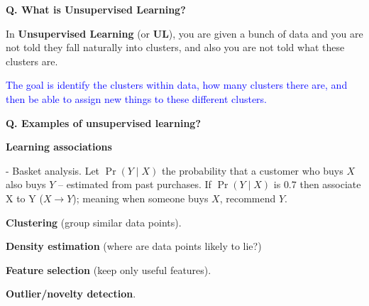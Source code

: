 \begin{frame}[fragile]{\textbf{Q. What is Unsupervised Learning?}}
  \begin{wideitemize}
    \item In \textbf{Unsupervised Learning} (or \textbf{UL}), you are given a
    bunch of data and you are not told they fall naturally into clusters, and
    also you are not told what these clusters are.
    \item \textcolor{blue}{The goal is identify the clusters within data, how
    many clusters there are, and then be able to assign new things to
    these different clusters.}
  \end{wideitemize}
\end{frame}


\begin{frame}[fragile]{\textbf{Q. Examples of unsupervised learning?}}
  \begin{wideitemize}
  \item \textbf{Learning associations}\vspace{.4em}
    \begin{wideitemize}
    \item[-] Basket analysis. Let $\Pr(Y \mid X)$ the probability that a
      customer who buys $X$ also buys $Y$ -- estimated from past purchases. If
      $\Pr(Y \mid X)$ is $0.7$ then associate X to Y ($X \rightarrow Y$);
      meaning when someone buys $X$, recommend $Y$.
    \end{wideitemize}
  \item \textbf{Clustering} (group similar data points).
  \item \textbf{Density estimation} (where are data points likely to lie?)
  \item \textbf{Feature selection} (keep only useful features).
  \item \textbf{Outlier/novelty detection}.
  \end{wideitemize}
\end{frame}

